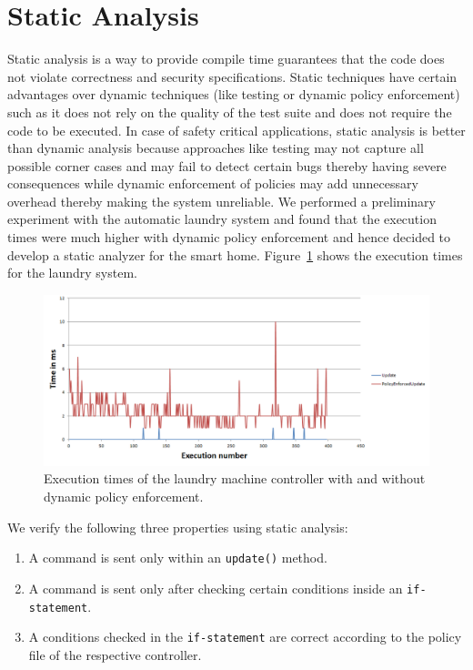 \documentclass{article}
\begin{document}
\section{Static Analysis}
\label{sec:analysis}
Static analysis is a way to provide compile time guarantees that the code does not violate correctness and security specifications. Static techniques have certain advantages over dynamic techniques (like testing or dynamic policy enforcement) such as it does not rely on the quality of the test suite and does not require the code to be executed. In case of safety critical applications, static analysis is better than dynamic analysis because approaches like testing may not capture all possible corner cases and may fail to detect certain bugs thereby having severe consequences while dynamic enforcement of policies may add unnecessary overhead thereby making the system unreliable. We performed a preliminary experiment with the automatic laundry system and found that the execution times were much higher with dynamic policy enforcement and hence decided to develop a static analyzer for the smart home. Figure~\ref{fig:dynamic} shows the execution times for the laundry system. 

\begin{figure}[htpb]
\begin{center}
\includegraphics[scale=0.6, trim = 0 0 0 0]{results_update.png}
\caption{Execution times of the laundry machine controller with and without dynamic policy enforcement.}
\label{fig:dynamic}
\end{center}
\end{figure}
We verify the following three properties using static analysis:
\begin{enumerate}[topsep=0pt,itemsep=-1ex,partopsep=1ex,parsep=1ex]
    \item A command is sent only within an \texttt{update()} method.
    \item A command is sent only after checking certain conditions inside an \texttt{if-statement}.
    \item A conditions checked in the \texttt{if-statement} are correct according to the policy file of the respective controller.
\end{enumerate}
\end{document}
